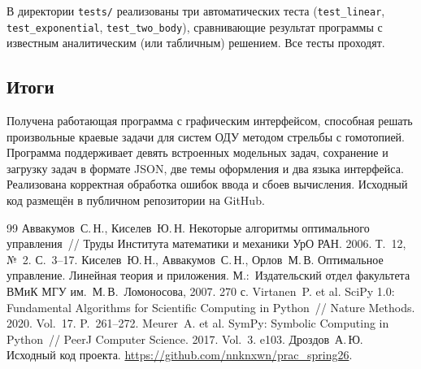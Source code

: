 \documentclass[12pt]{article}
\begin{document}
В директории \texttt{tests/} реализованы три автоматических теста (\texttt{test\_linear}, \texttt{test\_exponential}, \texttt{test\_two\_body}), сравнивающие результат программы с известным аналитическим (или табличным) решением. Все тесты проходят.

\subsection{Итоги}

Получена работающая программа с графическим интерфейсом, способная решать произвольные краевые задачи для систем ОДУ методом стрельбы с гомотопией. Программа поддерживает девять встроенных модельных задач, сохранение и загрузку задач в формате JSON, две темы оформления и два языка интерфейса. Реализована корректная обработка ошибок ввода и сбоев вычисления. Исходный код размещён в публичном репозитории на GitHub.

\newpage
{}%
\begin{thebibliography}{99}
   Аввакумов~С.\,Н., Киселев~Ю.\,Н. Некоторые алгоритмы оптимального управления~// Труды Института математики и механики УрО РАН. 2006. Т.~12, №~2. С.~3--17.
   Киселев~Ю.\,Н., Аввакумов~С.\,Н., Орлов~М.\,В. Оптимальное управление. Линейная теория и приложения. М.:~Издательский отдел факультета ВМиК МГУ им.~М.\,В.~Ломоносова, 2007. 270 с.
   Virtanen~P. et al. SciPy 1.0: Fundamental Algorithms for Scientific Computing in Python~// Nature Methods. 2020. Vol.~17. P.~261--272.
   Meurer~A. et al. SymPy: Symbolic Computing in Python~// PeerJ Computer Science. 2017. Vol.~3. e103.
   Дроздов~А.\,Ю. Исходный код проекта. \url{https://github.com/nnknxwn/prac_spring26}.
\end{thebibliography}
\end{document}
